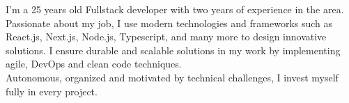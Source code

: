 
\begin{cvparagraph}
    I'm a 25 years old Fullstack developer with two years of experience in the area. \\
    Passionate about my job, I use modern technologies and frameworks such as React.js, Next.js, Node.js, Typescript, and many more to design innovative solutions. I ensure durable and scalable solutions in my work by implementing agile, DevOps and clean code techniques.\\
    Autonomous, organized and motivated by technical challenges, I invest myself fully in every project.
\end{cvparagraph}
